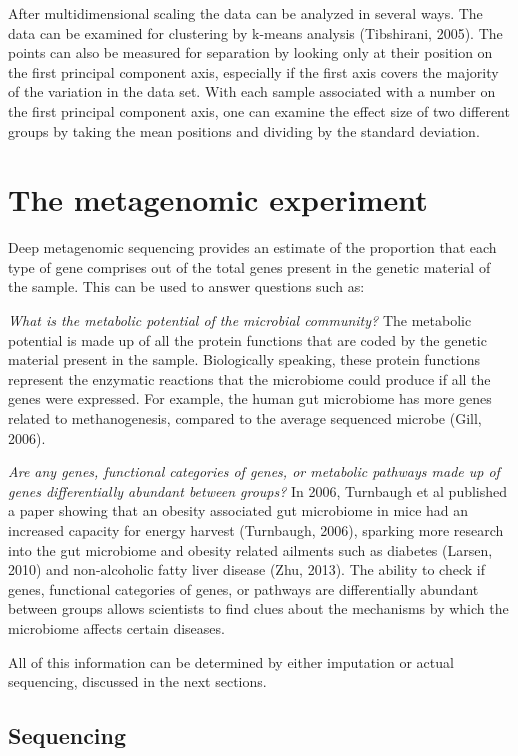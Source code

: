 After multidimensional scaling the data can be analyzed in several ways. The data can be examined for clustering by k-means analysis (Tibshirani, 2005). The points can also be measured for separation by looking only at their position on the first principal component axis, especially if the first axis covers the majority of the variation in the data set. With each sample associated with a number on the first principal component axis, one can examine the effect size of two different groups by taking the mean positions and dividing by the standard deviation.

\section{The metagenomic experiment}
Deep metagenomic sequencing provides an estimate of the proportion that each type of gene comprises out of the total genes present in the genetic material of the sample. This can be used to answer questions such as:

\textit{What is the metabolic potential of the microbial community?}
The metabolic potential is made up of all the protein functions that are coded by the genetic material present in the sample. Biologically speaking, these protein functions represent the enzymatic reactions that the microbiome could produce if all the genes were expressed. For example, the human gut microbiome has more genes related to methanogenesis, compared to the average sequenced microbe (Gill, 2006).

\textit{Are any genes, functional categories of genes, or metabolic pathways made up of genes differentially abundant between groups?}
In 2006, Turnbaugh et al published a paper showing that an obesity associated gut microbiome in mice had an increased capacity for energy harvest (Turnbaugh, 2006), sparking more research into the gut microbiome and obesity related ailments such as diabetes (Larsen, 2010) and non-alcoholic fatty liver disease (Zhu, 2013). The ability to check if genes, functional categories of genes, or pathways are differentially abundant between groups allows scientists to find clues about the mechanisms by which the microbiome affects certain diseases.

All of this information can be determined by either imputation or actual sequencing, discussed in the next sections.

\subsection{Sequencing}


